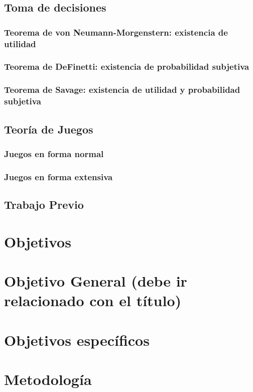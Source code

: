 \documentclass[11pt]{article}
\theoremstyle{plain}
\begin{document}
	\subsection{Toma de decisiones}
		\subsubsection{Teorema de von Neumann-Morgenstern: existencia de utilidad}
		\subsubsection{Teorema de DeFinetti: existencia de probabilidad subjetiva}
		\subsubsection{Teorema de Savage: existencia de utilidad y probabilidad subjetiva}
	\subsection{Teoría de Juegos}
		\subsubsection{Juegos en forma normal}
		\subsubsection{Juegos en forma extensiva}
	
	\subsection{Trabajo Previo}

\section{Objetivos}
	\section{Objetivo General (debe ir relacionado con el título)}
	\section{Objetivos específicos}
	
\section{Metodología}
\end{document}
